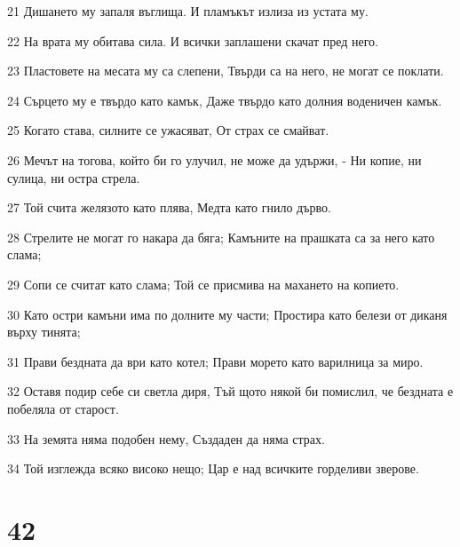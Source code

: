 \par 21 Дишането му запаля въглища. И пламъкът излиза из устата му.
\par 22 На врата му обитава сила. И всички заплашени скачат пред него.
\par 23 Пластовете на месата му са слепени, Твърди са на него, не могат се поклати.
\par 24 Сърцето му е твърдо като камък, Даже твърдо като долния воденичен камък.
\par 25 Когато става, силните се ужасяват, От страх се смайват.
\par 26 Мечът на тогова, който би го улучил, не може да удържи, - Ни копие, ни сулица, ни остра стрела.
\par 27 Той счита желязото като плява, Медта като гнило дърво.
\par 28 Стрелите не могат го накара да бяга; Камъните на прашката са за него като слама;
\par 29 Сопи се считат като слама; Той се присмива на махането на копието.
\par 30 Като остри камъни има по долните му части; Простира като белези от диканя върху тинята;
\par 31 Прави бездната да ври като котел; Прави морето като варилница за миро.
\par 32 Оставя подир себе си светла диря, Тъй щото някой би помислил, че бездната е побеляла от старост.
\par 33 На земята няма подобен нему, Създаден да няма страх.
\par 34 Той изглежда всяко високо нещо; Цар е над всичките горделиви зверове.

\chapter{42}

